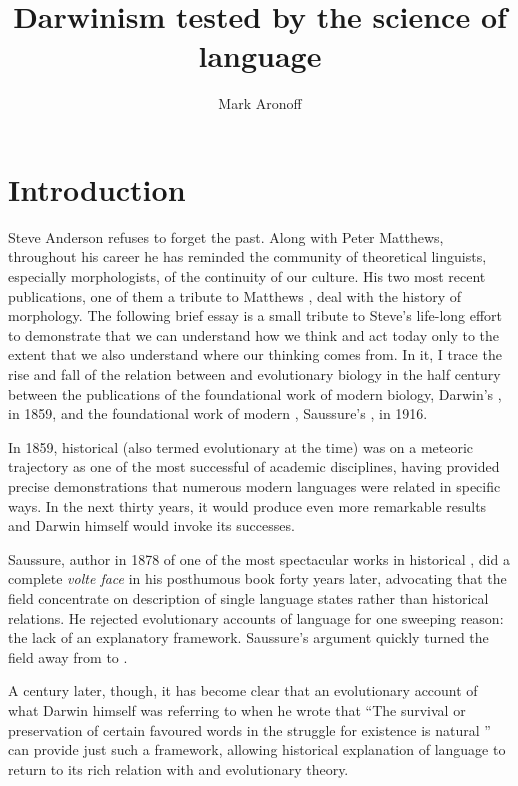 \documentclass[output=paper,
modfonts
]{LSP/langsci}
\title{Darwinism tested by the science of language}
\author{%
Mark Aronoff\affiliation{Stony Brook University}
}
\begin{document}
\maketitle


\section{Introduction}

Steve Anderson refuses to forget the past.  Along with Peter Matthews, throughout his career he has reminded the community of theoretical linguists, especially morphologists, of the continuity of our culture.  His two most recent publications, one of them a tribute to Matthews \citep{andersontoappeara,andersontoappearb}, deal with the history of morphology. The following brief essay is a small tribute to Steve's life-long effort to demonstrate that we can understand how we think and act today only to the extent that we also understand where our thinking comes from. In it, I trace the rise and fall of the relation between  and evolutionary biology in the half century between the publications of the foundational work of modern biology, Darwin's , in 1859, and the foundational work of modern , Saussure's , in 1916.

In 1859, historical (also termed evolutionary at the time)  was on a meteoric trajectory as one of the most successful of academic disciplines, having provided precise demonstrations that numerous modern languages were related in specific ways. In the next thirty years, it would produce even more remarkable results and {Darwin} himself would invoke its successes.

Saussure, author in 1878 of one of the most spectacular works in historical , did a complete \textit{volte face} in his posthumous book forty years later, advocating that the field concentrate on description  of single language states rather than historical relations. He rejected evolutionary accounts of language for one sweeping reason: the lack of an explanatory framework. Saussure's argument quickly turned the field away from  to .

A century later, though, it has become clear that an evolutionary account of what Darwin himself was referring to when he wrote that ``The survival or preservation of certain favoured words in the struggle for existence is natural '' \citep[61]{Darwin1871} can provide just such a framework, allowing historical explanation of language to return to its rich relation with  and evolutionary theory.
\end{document}
